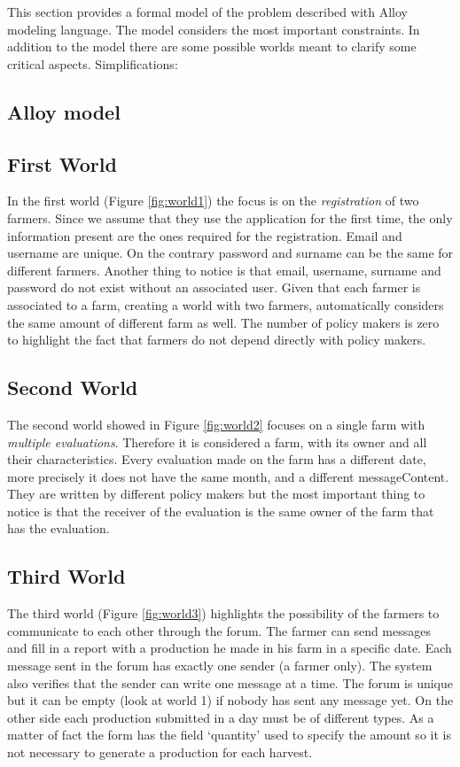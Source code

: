 
This section provides a formal model of the problem described with Alloy modeling language. 
The model considers the most important constraints. In addition to the model there are some 
possible worlds meant to clarify some critical aspects.
Simplifications: 

\subsection{Alloy model}


\subsection{First World}
In the first world (Figure \ref{fig:world1}) the focus is on the \textsl{registration} of two farmers. 
Since we assume that they use the application for the first time, the only information present 
are the ones required for the registration. Email and username are unique. On the contrary password and 
surname can be the same for different farmers. Another thing to notice is that email, username, surname and password do not 
exist without an associated user. 
Given that each farmer is associated to a farm, creating a world with two farmers, automatically considers
the same amount of different farm as well. The number of policy makers is zero to 
highlight the fact that farmers do not depend directly with policy makers.



\subsection{Second World}
The second world showed in Figure \ref{fig:world2} focuses on a single farm with \textsl{multiple evaluations}. 
Therefore it is considered a farm, with its owner and all their characteristics. 
Every evaluation made on the farm has a different date, more precisely it does not 
have the same month, and a different messageContent. They are written by different policy 
makers but the most important thing to notice is that the receiver of the evaluation 
is the same owner of the farm that has the evaluation.


\subsection{Third World}
The third world (Figure \ref{fig:world3}) highlights the possibility 
of the farmers to communicate to each other through the forum. The farmer can send messages and fill in a report with a production he made in his 
farm in a specific date. Each message sent in the forum has exactly 
one sender (a farmer only). The system also verifies that the sender can write 
one message at a time. 
The forum is unique but it can be empty (look at world 1) if nobody has sent any message yet. 
On the other side each production submitted in a day must be of different types. As a matter of fact the form 
has the field ‘quantity’ used to specify the amount so it is not necessary to generate a production for each harvest.

